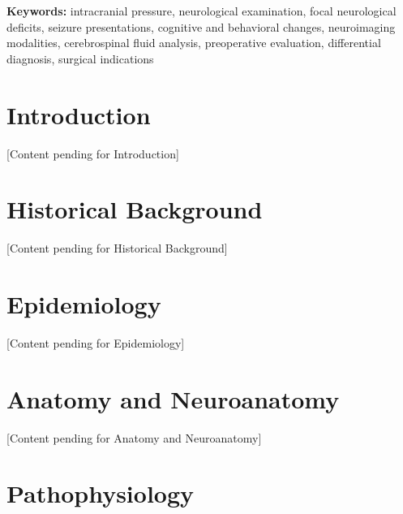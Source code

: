 \documentclass[12pt,a4paper]{article}
\begin{document}

\noindent\textbf{Keywords:} intracranial pressure, neurological examination, focal neurological deficits, seizure presentations, cognitive and behavioral changes, neuroimaging modalities, cerebrospinal fluid analysis, preoperative evaluation, differential diagnosis, surgical indications
\vspace{1em}




\section{Introduction}




[Content pending for Introduction]







\section{Historical Background}




[Content pending for Historical Background]







\section{Epidemiology}




[Content pending for Epidemiology]







\section{Anatomy and Neuroanatomy}




[Content pending for Anatomy and Neuroanatomy]







\section{Pathophysiology}
\end{document}
